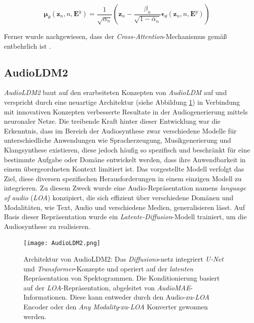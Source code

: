 \documentclass[
  a4paper,  %
  twoside,  %
  bibliography=totoc,
  headsepline,
  cleardoublepage=empty,
  parskip=half,
  draft=false
]{scrbook}
\begin{document}
\begin{equation}
    \boldsymbol{\mu}_\theta\left(\boldsymbol{z}_n, n, \boldsymbol{E}^y\right)=\frac{1}{\sqrt{\alpha_n}}\left(\boldsymbol{z}_n-\frac{\beta_n}{\sqrt{1-\bar{\alpha}_n}} \boldsymbol{\epsilon}_\theta\left(\boldsymbol{z}_n, n, \boldsymbol{E}^y\right)\right)
\end{equation}

Ferner wurde nachgewiesen, dass der \emph{Cross-Attention}-Mechanismus gemäß \cite{rombach_high-resolution_2022} entbehrlich ist \cite{liu_audioldm_2023}.

\subsection{AudioLDM2}

\emph{AudioLDM2} \cite{liu_audioldm2_2023} baut auf den erarbeiteten Konzepten von \emph{AudioLDM} \cite{liu_audioldm_2023} auf und verspricht durch eine neuartige Architektur (siehe Abbildung \ref{fig:AudioLDM2}) in Verbindung mit innovativen Konzepten verbesserte Resultate in der Audiogenerierung mittels neuronaler Netze. Die treibende Kraft hinter dieser Entwicklung war die Erkenntnis, dass im Bereich der Audiosynthese zwar verschiedene Modelle für unterschiedliche Anwendungen wie Spracherzeugung, Musikgenerierung und Klangsynthese existieren, diese jedoch häufig so spezifisch und beschränkt für eine bestimmte Aufgabe oder Domäne entwickelt werden, dass ihre Anwendbarkeit in einem übergeordneten Kontext limitiert ist. Das vorgestellte Modell verfolgt das Ziel, diese diversen spezifischen Herausforderungen in einem einzigen Modell zu integrieren. Zu diesem Zweck wurde eine Audio-Repräsentation namens \emph{language of audio} (\emph{LOA}) konzipiert, die sich effizient über verschiedene Domänen und Modalitäten, wie Text, Audio und verschiedene Medien, generalisieren lässt. Auf Basis dieser Repräsentation wurde ein \emph{Latente-Diffusion}-Modell trainiert, um die Audiosynthese zu realisieren. \cite{liu_audioldm2_2023}

\begin{figure}[h]
  \centering
  \texttt{[image: AudioLDM2.png]}
  \caption[AudioLDM2 Architektur]{Architektur von AudioLDM2: Das \emph{Diffusions}-netz integriert \emph{U-Net} und \emph{Transformer}-Konzepte und operiert auf der \emph{latenten} Repräsentation von Spektogrammen. Die Konditionierung basiert auf der \emph{LOA}-Repräsentation, abgeleitet von \emph{AudioMAE}-Informationen. Diese kann entweder durch den Audio-zu-\emph{LOA} Encoder oder den \emph{Any Modality}-zu-\emph{LOA} Konverter gewonnen werden. \cite{liu_audioldm2_2023}}
  \label{fig:AudioLDM2}
\end{figure} 
\end{document}
